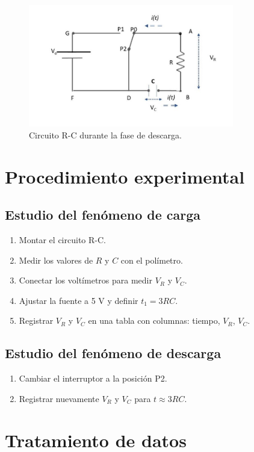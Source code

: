 \documentclass{article}
\begin{document}
\begin{figure}[h]
    \centering
    \includegraphics[width=0.8\textwidth]{circuito_descarga.png}
    \caption{Circuito R-C durante la fase de descarga.}
    \label{fig:descarga}
\end{figure}

\section{Procedimiento experimental}
\subsection{Estudio del fenómeno de carga}
\begin{enumerate}
    \item Montar el circuito R-C.
    \item Medir los valores de \(R\) y \(C\) con el polímetro.
    \item Conectar los voltímetros para medir \(V_R\) y \(V_C\).
    \item Ajustar la fuente a 5 V y definir \(t_1 = 3RC\).
    \item Registrar \(V_R\) y \(V_C\) en una tabla con columnas: tiempo, \(V_R\), \(V_C\).
\end{enumerate}

\subsection{Estudio del fenómeno de descarga}
\begin{enumerate}
    \item Cambiar el interruptor a la posición P2.
    \item Registrar nuevamente \(V_R\) y \(V_C\) para \(t \approx 3RC\).
\end{enumerate}
\section{Tratamiento de datos}
\end{document}
